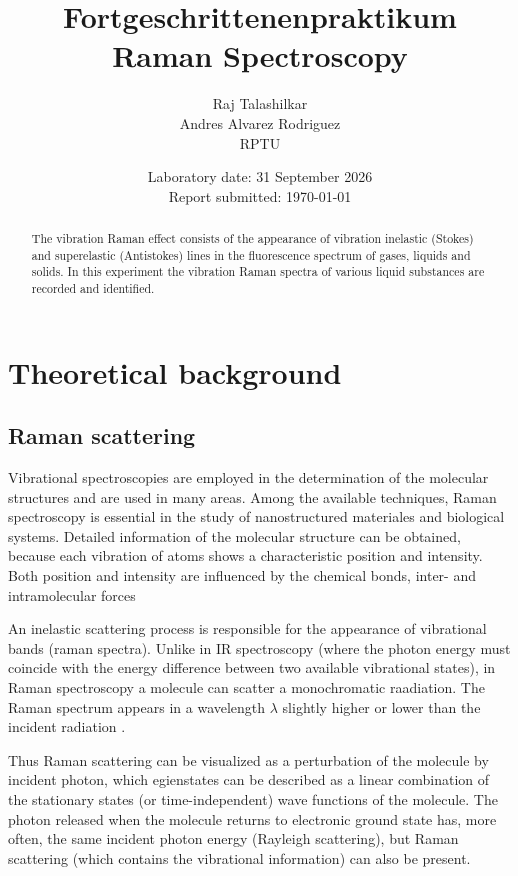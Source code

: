\documentclass[11pt,a4paper]{article}
\title{
    \textbf{Fortgeschrittenenpraktikum}\\[0.5em]
    \Large Raman Spectroscopy
}
\author{
    Raj Talashilkar\\
    Andres Alvarez Rodriguez\\
   RPTU 
}
\date{
    Laboratory date: 31 September 2026\\
    Report submitted: \today 
}
\begin{document}
\maketitle

\begin{abstract}
The vibration Raman effect consists of the appearance of vibration inelastic (Stokes) and superelastic (Antistokes) lines in the fluorescence spectrum of gases, liquids and solids. In this experiment the vibration Raman spectra of various liquid substances are recorded and identified.
\end{abstract}

\section{Theoretical background}
\subsection{Raman scattering}
Vibrational spectroscopies are employed in the determination of the molecular structures and are used in many areas. Among the available techniques, Raman spectroscopy is essential in the study of nanostructured materiales and biological systems. Detailed information of the molecular structure can be obtained, because each vibration of atoms shows a characteristic position and intensity. Both position and intensity are influenced by the chemical bonds, inter- and intramolecular forces \cite{Gustavo}



An inelastic scattering process is responsible for the appearance of vibrational bands (raman spectra). Unlike in IR spectroscopy (where the photon energy must coincide with the energy difference between two available vibrational states), in Raman spectroscopy a molecule can scatter a monochromatic raadiation. The Raman spectrum appears in a wavelength $\lambda$ slightly higher or lower than the incident radiation \cite{Gustavo}.



Thus Raman scattering can be visualized as a perturbation of the molecule by incident photon, which egienstates can be described as a linear combination of the stationary states (or time-independent) wave functions of the molecule. The photon released when the molecule returns to electronic ground state has, more often, the same incident photon energy (Rayleigh scattering), but Raman scattering (which contains the vibrational information) can also be present. \cite{Gustavo}
\end{document}

